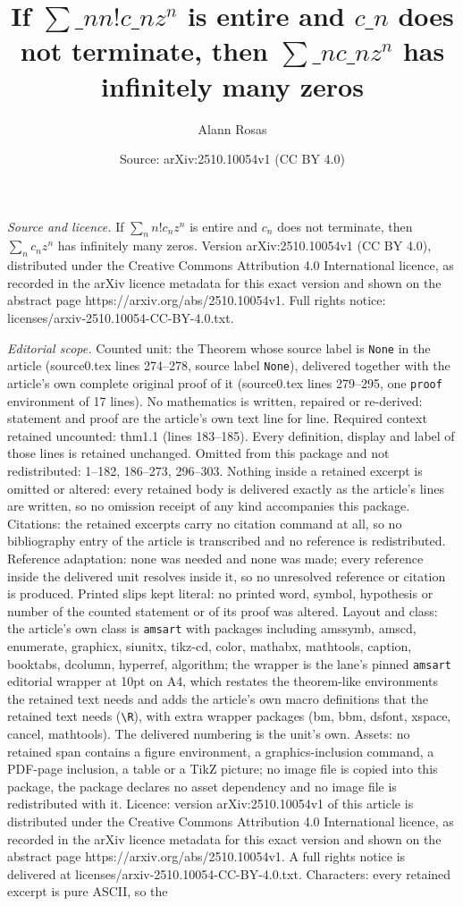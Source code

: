 \documentclass[10pt,a4paper]{amsart}
\title[If $\sum\_n n! c\_n z^n$ is entire and $c\_n$ does not terminat]{If $\sum\_n n! c\_n z^n$ is entire and $c\_n$ does not terminate, then $\sum\_n c\_n z^n$ has infinitely many zeros}
\author{Alann Rosas}
\date{Source: arXiv:2510.10054v1 (CC BY 4.0)}
\begin{document}
\maketitle

\noindent\emph{Source and licence.} If $\sum_n n! c_n z^n$ is entire and $c_n$ does not terminate, then $\sum_n c_n z^n$ has infinitely many zeros. Version arXiv:2510.10054v1 (CC BY 4.0), distributed under the Creative Commons Attribution 4.0 International licence, as recorded in the arXiv licence metadata for this exact version and shown on the abstract page https://arxiv.org/abs/2510.10054v1. Full rights notice: licenses/arxiv-2510.10054-CC-BY-4.0.txt.\par\smallskip

\noindent\textit{Editorial scope.} Counted unit: the Theorem whose source label is \texttt{None} in the article (source0.tex lines 274--278, source label \texttt{None}), delivered together with the article's own complete original proof of it (source0.tex lines 279--295, one \texttt{proof} environment of 17 lines). No mathematics is written, repaired or re-derived: statement and proof are the article's own text line for line. Required context retained uncounted: thm1.1 (lines 183--185). Every definition, display and label of those lines is retained unchanged. Omitted from this package and not redistributed: 1--182, 186--273, 296--303. Nothing inside a retained excerpt is omitted or altered: every retained body is delivered exactly as the article's lines are written, so no omission receipt of any kind accompanies this package. Citations: the retained excerpts carry no citation command at all, so no bibliography entry of the article is transcribed and no reference is redistributed. Reference adaptation: none was needed and none was made; every reference inside the delivered unit resolves inside it, so no unresolved reference or citation is produced. Printed slips kept literal: no printed word, symbol, hypothesis or number of the counted statement or of its proof was altered. Layout and class: the article's own class is \texttt{amsart} with packages including amssymb, amscd, enumerate, graphicx, siunitx, tikz-cd, color, mathabx, mathtools, caption, booktabs, dcolumn, hyperref, algorithm; the wrapper is the lane's pinned \texttt{amsart} editorial wrapper at 10pt on A4, which restates the theorem-like environments the retained text needs and adds the article's own macro definitions that the retained text needs (\texttt{\textbackslash R}), with extra wrapper packages (bm, bbm, dsfont, xspace, cancel, mathtools). The delivered numbering is the unit's own. Assets: no retained span contains a figure environment, a graphics-inclusion command, a PDF-page inclusion, a table or a TikZ picture; no image file is copied into this package, the package declares no asset dependency and no image file is redistributed with it. Licence: version arXiv:2510.10054v1 of this article is distributed under the Creative Commons Attribution 4.0 International licence, as recorded in the arXiv licence metadata for this exact version and shown on the abstract page https://arxiv.org/abs/2510.10054v1. A full rights notice is delivered at licenses/arxiv-2510.10054-CC-BY-4.0.txt. Characters: every retained excerpt is pure ASCII, so the 
\end{document}
